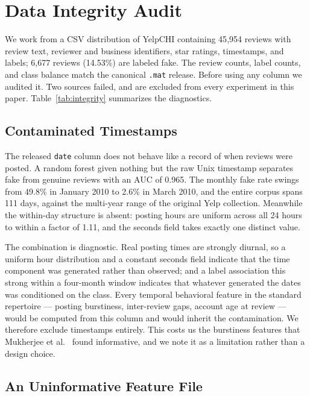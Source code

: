\documentclass[conference]{IEEEtran}
\begin{document}
\section{Data Integrity Audit}
\label{sec:integrity}

We work from a CSV distribution of YelpCHI containing 45{,}954 reviews with
review text, reviewer and business identifiers, star ratings, timestamps, and
labels; 6{,}677 reviews (14.53\%) are labeled fake. The review counts, label
counts, and class balance match the canonical \texttt{.mat} release. Before
using any column we audited it. Two sources failed, and are excluded from every
experiment in this paper. Table~\ref{tab:integrity} summarizes the diagnostics.



\subsection{Contaminated Timestamps}

The released \texttt{date} column does not behave like a record of when reviews
were posted. A random forest given nothing but the raw Unix timestamp separates
fake from genuine reviews with an AUC of 0.965. The monthly fake rate swings
from 49.8\% in January 2010 to 2.6\% in March 2010, and the entire corpus spans
111 days, against the multi-year range of the original Yelp collection.
Meanwhile the within-day structure is absent: posting hours are uniform across
all 24 hours to within a factor of 1.11, and the seconds field takes exactly one
distinct value.

The combination is diagnostic. Real posting times are strongly diurnal, so a
uniform hour distribution and a constant seconds field indicate that the time
component was generated rather than observed; and a label association this
strong within a four-month window indicates that whatever generated the dates
was conditioned on the class. Every temporal behavioral feature in the standard
repertoire --- posting burstiness, inter-review gaps, account age at review ---
would be computed from this column and would inherit the contamination. We
therefore exclude timestamps entirely. This costs us the burstiness features
that Mukherjee et al.~\cite{mukherjee2013what} found informative, and we note it
as a limitation rather than a design choice.

\subsection{An Uninformative Feature File}
\end{document}
